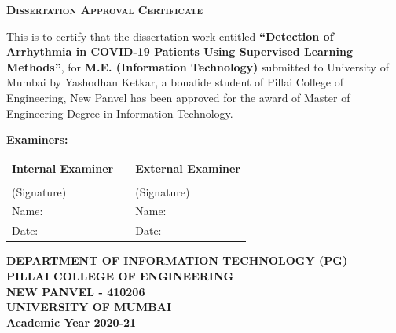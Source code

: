 \thispagestyle{empty}

{\centering
  {\LARGE\bf
    \scshape{Dissertation Approval Certificate}
  }\\
}
\begin{spacing}{1.5}
  \vspace{.5cm}
  {\centering
    {
      This is to certify that the dissertation work entitled \textbf{``Detection of
        Arrhythmia in COVID-19 Patients Using Supervised Learning Methods''}, for \textbf{M.E.
        (Information Technology)} submitted to University of Mumbai by Yashodhan Ketkar, a bonafide
      student of Pillai College of Engineering, New Panvel has been approved for the award of
      Master of Engineering Degree in Information Technology.
    }
  }

  \vspace{1.75cm}
  \noindent
  {\Large\bf
    {Examiners:}
  }

  \begin{table}[H]
    \centering
    \begin{tabularx}{\textwidth}{@{}L{13em}L{9em}L{13em}@{}}
      {\large\bf Internal Examiner} &  & {\large\bf External Examiner} \\
                                    &  &                               \\
      (Signature)                   &  & (Signature)                   \\
      Name:                         &  & Name:                         \\
      Date:                         &  & Date:                         \\
    \end{tabularx}
  \end{table}
\end{spacing}

\vspace{2.5cm}
{\centering\large
\begin{figure}[h!]
  {\par}
\end{figure}
\vspace{0.2cm}

{\bf
  DEPARTMENT OF INFORMATION TECHNOLOGY (PG)\\
  \vspace{0.2cm}
  \bf {PILLAI COLLEGE OF ENGINEERING}\\
  \bf NEW PANVEL - 410206
} \\
{
\hspace{.5cm}
{\bf UNIVERSITY OF MUMBAI} \\
\vspace{0.2cm}
{\bf Academic Year 2020-21}\\
}
}